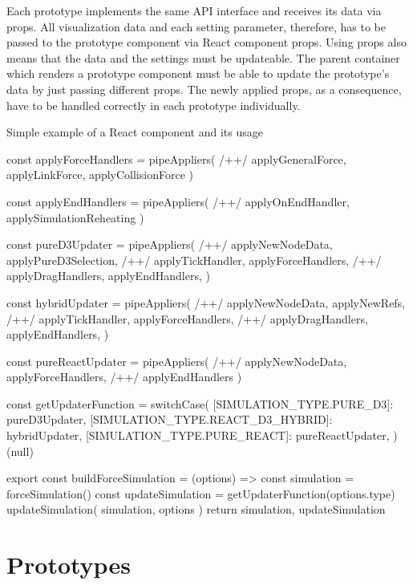 Each prototype implements the same API interface and receives its data via props. All visualization data and each setting parameter, therefore, has to be passed to the prototype component via React component props. Using props also means that the data and the settings must be updateable. The parent container which renders a prototype component must be able to update the prototype's data by just passing different props. The newly applied props, as a consequence, have to be handled correctly in each prototype individually.

\begin{program}[H]
\caption{Simple example of a React component and its usage} 
\label{prog:forceBuildModule}
\begin{JsCode}
const applyForceHandlers = pipeAppliers( /+\label{line:composition1}+/
  applyGeneralForce, 
  applyLinkForce, 
  applyCollisionForce
)

const applyEndHandlers = pipeAppliers( /+\label{line:composition2}+/
  applyOnEndHandler, 
  applySimulationReheating
)

const pureD3Updater = pipeAppliers( /+\label{line:updater1}+/
  applyNewNodeData,
  applyPureD3Selection, /+\label{line:applyPureD3Selection}+/
  applyTickHandler,
  applyForceHandlers, /+\label{line:applyForce1}+/
  applyDragHandlers,
  applyEndHandlers,
)

const hybridUpdater = pipeAppliers( /+\label{line:updater2}+/
  applyNewNodeData,
  applyNewRefs, /+\label{line:applyNewRefs}+/
  applyTickHandler,
  applyForceHandlers, /+\label{line:applyForce2}+/
  applyDragHandlers,
  applyEndHandlers,
)

const pureReactUpdater = pipeAppliers( /+\label{line:updater3}+/
  applyNewNodeData, 
  applyForceHandlers, /+\label{line:applyForce3}+/
  applyEndHandlers
)

const getUpdaterFunction = switchCase({
  [SIMULATION_TYPE.PURE_D3]: pureD3Updater,
  [SIMULATION_TYPE.REACT_D3_HYBRID]: hybridUpdater,
  [SIMULATION_TYPE.PURE_REACT]: pureReactUpdater,
})(null)

export const buildForceSimulation = (options) => {
  const simulation = forceSimulation()
  const updateSimulation = getUpdaterFunction(options.type)
  updateSimulation({ simulation, options })
  return { simulation, updateSimulation }
}
\end{JsCode}
\end{program}


\section{Prototypes}


